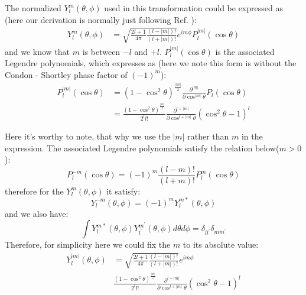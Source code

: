 The normalized $Y^{m}_{l}(\theta,\phi)$ used in this transformation could be expressed as
(here our derivation is normally just following Ref. \cite{QUA:QUA560540202}):
\begin{equation}
 \begin{split}
  Y^{m}_{l}(\theta,\phi) &= 
\sqrt{\frac{2l+1}{4\pi}\frac{(l-|m|)!}{(l+|m|)!}}e^{im\phi}P_{l}^{|m|}(\cos\theta) 
 \end{split}
\label{int_transform_pure_cart_eq:1}
\end{equation}
and we know that $m$ is between $-l$ and $+l$. $P_{l}^{|m|}(\cos\theta)$ is the 
associated Legendre polynomials, which expresses as (here we note this form is without
the Condon - Shortley phase factor of $(-1)^{m}$):
\begin{equation}
 \label{int_transform_pure_cart_eq:2}
\begin{split}
 P_{l}^{|m|}(\cos\theta) &= (1-\cos^{2}\theta)^{\frac{|m|}{2}}
\frac{\partial^{|m|}}{\partial\cos^{|m|}\theta}P_{l}(\cos\theta) \\
&= \frac{(1-\cos^{2}\theta)^{\frac{|m|}{2}}}{2^{l}l!}
\frac{\partial^{l+|m|}}{\partial\cos^{l+|m|}\theta}(\cos^{2}\theta-1)^{l}
\end{split}
\end{equation}

Here it's worthy to note, that why we use the $|m|$ rather than $m$ in the expression.
The associated Legendre polynomials satisfy the relation below($m > 0$):
\begin{equation}
 P_{l}^{-m}(\cos\theta) = (-1)^{m}\frac{(l-m)!}{(l+m)!}P_{l}^{m}(\cos\theta)
\end{equation}
therefore for the $Y^{m}_{l}(\theta,\phi)$ it satisfy:
\begin{equation}
 Y^{-m}_{l}(\theta,\phi) = (-1)^{m}Y^{m*}_{l}(\theta,\phi)
\end{equation}
and we also have:
\begin{equation}
 \int Y^{m*}_{l}(\theta,\phi) Y^{m^{'}}_{l^{'}}(\theta,\phi) d\theta d\phi = 
 \delta_{ll^{'}}\delta_{mm^{'}}
\end{equation}
Therefore, for simplicity here we could fix the $m$ to its absolute value:
\begin{equation}
\begin{split}
Y^{|m|}_{l}(\theta,\phi) &= 
\sqrt{\frac{2l+1}{4\pi}\frac{(l-|m|)!}{(l+|m|)!}}e^{im\phi} \\
&\frac{(1-\cos^{2}\theta)^{\frac{|m|}{2}}}{2^{l}l!}
\frac{\partial^{l+|m|}}{\partial\cos^{l+|m|}\theta}(\cos^{2}\theta-1)^{l} 
\end{split}
\label{int_transform_pure_cart_eq:3}
\end{equation}

